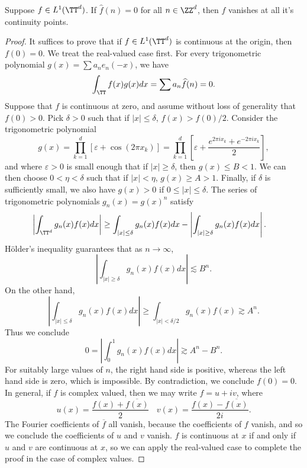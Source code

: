 \begin{theorem}
    Suppose $f \in L^1(\TT^d)$. If $\widehat{f}(n) = 0$ for all $n \in \ZZ^d$, then $f$ vanishes at all it's continuity points.
\end{theorem}
\begin{proof}
    It suffices to prove that if $f \in L^1(\TT^d)$ is continuous at the origin, then $f(0) = 0$. We treat the real-valued case first. For every trigonometric polynomial $g(x) = \sum a_n e_n(-x)$, we have
    \[ \int_{\TT} f(x) g(x) dx = \sum a_n \widehat{f}(n) = 0. \]
    Suppose that $f$ is continuous at zero, and assume without loss of generality that $f(0) > 0$. Pick $\delta > 0$ such that if $|x| \leq \delta$, $f(x) > f(0)/2$. Consider the trigonometric polynomial
    \[ g(x) = \prod_{k = 1}^d [\varepsilon + \cos(2 \pi x_k)] = \prod_{k = 1}^d \left[ \varepsilon + \frac{e^{2 \pi i x_k} + e^{- 2 \pi i x_k}}{2} \right], \]
    and where $\varepsilon > 0$ is small enough that if $|x| \geq \delta$, then $g(x) \leq B < 1$. We can then choose $0 < \eta < \delta$ such that if $|x| < \eta$, $g(x) \geq A > 1$. Finally, if $\delta$ is sufficiently small, we also have $g(x) > 0$ if $0 \leq |x| \leq \delta$. The series of trigonometric polynomials $g_n(x) = g(x)^n$ satisfy
    \begin{align*}
        \left| \int_{\TT^d} g_n(x) f(x) dx \right| &\geq \int_{|x| \leq \delta} g_n(x) f(x) dx - \left| \int_{|x| \geq \delta} g_n(x) f(x) dx \right|.
    \end{align*}
    H\"{o}lder's inequality guarantees that as $n \to \infty$,
    \[ \left| \int_{|x| \geq \delta} g_n(x) f(x) dx \right| \lesssim B^n. \]
    On the other hand,
    \[ \left| \int_{|x| \leq \delta} g_n(x) f(x) dx \right| \geq \int_{|x| < \delta/2} g_n(x) f(x) \gtrsim A^n. \]
    Thus we conclude
    \[ 0 = \left| \int_0^1 g_n(x) f(x) dx \right| \gtrsim A^n - B^n. \]
    For suitably large values of $n$, the right hand side is positive, whereas the left hand side is zero, which is impossible. By contradiction, we conclude $f(0) = 0$. In general, if $f$ is complex valued, then we may write $f = u + iv$, where
    \[ u(x) = \frac{f(x) + \overline{f(x)}}{2}\ \ \ \ v(x) = \frac{f(x) - \overline{f(x)}}{2i}. \]
    The Fourier coefficients of $\overline{f}$ all vanish, because the coefficients of $f$ vanish, and so we conclude the coefficients of $u$ and $v$ vanish. $f$ is continuous at $x$ if and only if $u$ and $v$ are continuous at $x$, so we can apply the real-valued case to complete the proof in the case of complex values.
\end{proof}

